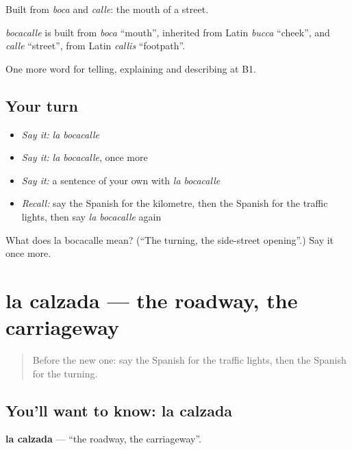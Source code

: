 Built from \emph{boca} and \emph{calle}: the mouth of a street.

\begin{cousinweb}
\emph{bocacalle} is built from \emph{boca} \textquotedblleft{}mouth\textquotedblright{}, inherited from Latin \emph{bucca} \textquotedblleft{}cheek\textquotedblright{}, and \emph{calle} \textquotedblleft{}street\textquotedblright{}, from Latin \emph{callis} \textquotedblleft{}footpath\textquotedblright{}.
\end{cousinweb}

\begin{grammarlens}[title={What you've built}]
One more word for telling, explaining and describing at B1.
\end{grammarlens}

\subsection*{Your turn}
\begin{itemize}
\raggedright
  \item \emph{Say it:} \emph{la bocacalle}
  \item \emph{Say it:} \emph{la bocacalle}, once more
  \item \emph{Say it:} a sentence of your own with \emph{la bocacalle}
  \item \emph{Recall:} say the Spanish for the kilometre, then the Spanish for the traffic lights, then say \emph{la bocacalle} again
\end{itemize}

\begin{tcolorbox}[breakable,colback=teal!4,colframe=teal!35!black,title={Before you move on}]
What does la bocacalle mean? (\textquotedblleft{}The turning, the side-street opening\textquotedblright{}.) Say it once more.
\end{tcolorbox}
\section[la calzada]{la calzada — the roadway, the carriageway}

\label{lesson:ES-C647-calzada}



\begin{quote}
Before the new one: say the Spanish for the traffic lights, then the Spanish for the turning.
\end{quote}

\subsection*{You'll want to know: la calzada}
\textbf{la calzada} — \textquotedblleft{}the roadway, the carriageway\textquotedblright{}.

